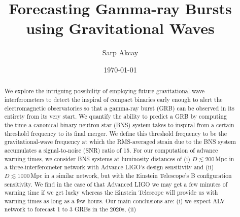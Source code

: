 \documentclass[amsmath,amssymb,aps,floats,amsfonts,notitlepage,superscriptaddress,eqsecnum,nofootinbib,10pt]{revtex4-1}
\begin{document}
\title{Forecasting Gamma-ray Bursts using Gravitational Waves}

\author{Sarp Akcay}

\date{\today}

\begin{abstract}
We explore the intriguing possibility of employing future gravitational-wave interferometers to detect the inspiral of compact binaries early enough to alert the electromagnetic observatories so that a gamma-ray burst (GRB) can be observed in its entirety from its very start.
We quantify the ability to predict a GRB by computing the time a canonical binary neutron star (BNS) system takes to inspiral from a certain threshold frequency to its final merger. We define this threshold frequency to be the gravitational-wave frequency at which the RMS-averaged strain due to the BNS system accumulates a signal-to-noise (SNR) ratio of 15. For our computation of advance warning times, we consider BNS systems at luminosity distances of (i) $D\lesssim200\,$Mpc in a three-interferometer network with Advance LIGO's design sensitivity and (ii) $D \lesssim 1000\,$Mpc in a similar network, but with the Einstein Telescope's B configuration
sensitivity. We find in the case of that Advanced LIGO we may get a few minutes of warning time if we get lucky whereas the Einstein Telescope will provide us
with warning times as long as a few hours.
Our main conclusions are: (i) we expect ALV network to forecast 1 to 3 GRBs in the 2020s, (ii)

\end{abstract}
\maketitle
\end{document}
